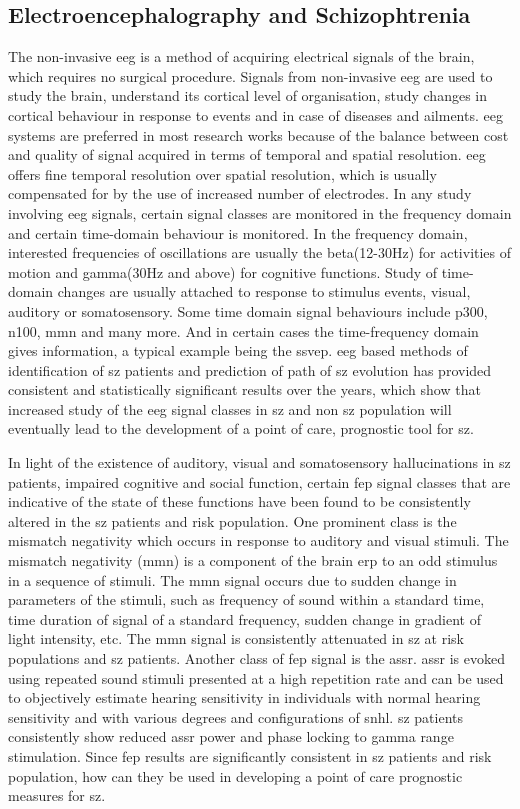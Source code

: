 \subsection{Electroencephalography and Schizophtrenia}
The non-invasive \ac{eeg} is a method of acquiring electrical signals of the brain, which requires no surgical procedure. Signals from non-invasive \ac{eeg} are used to study the brain, understand its cortical level of organisation, study changes in cortical behaviour in response to events and in case of diseases and ailments. \ac{eeg} systems are preferred in most research works because of the balance between cost and quality of signal acquired in terms of temporal and spatial resolution. \ac{eeg} offers fine temporal resolution over spatial resolution, which is usually compensated for by the use of increased number of electrodes. In any study involving \ac{eeg} signals, certain signal classes are monitored in the frequency domain and certain time-domain behaviour is monitored. In the frequency domain, interested frequencies of oscillations are usually the beta(12-30Hz) for activities of motion and gamma(30Hz and above) for cognitive functions. Study of time-domain changes are usually attached to response to stimulus events, visual, auditory or somatosensory. Some time domain signal behaviours include \ac{p300}, \ac{n100}, \ac{mmn} and many more. And in certain cases the time-frequency domain gives information, a typical example being the \ac{ssvep}. \ac{eeg} based methods of identification of \ac{sz} patients and prediction of path of \ac{sz} evolution has provided consistent and statistically significant results over the years, which show that increased study of the \ac{eeg} signal classes in \ac{sz} and non \ac{sz} population will eventually lead to the development of a point of care, prognostic tool for \ac{sz}.

In light of the existence of auditory, visual and somatosensory hallucinations in \ac{sz} patients, impaired cognitive and social function, certain \ac{fep} signal classes that are indicative of the state of these functions have been found to be consistently altered in the \ac{sz} patients and risk population. One prominent class is the mismatch negativity which occurs in response to auditory and visual stimuli. The mismatch negativity (\ac{mmn}) is a component of the brain \ac{erp} to an odd stimulus in a sequence of stimuli. The \ac{mmn} signal occurs due to sudden change in parameters of the stimuli, such as frequency of sound within a standard time, time duration of signal of a standard frequency, sudden change in gradient of light intensity, etc. The \ac{mmn} signal is consistently attenuated in \ac{sz} at risk populations and \ac{sz} patients. Another class of \ac{fep} signal is the \ac{assr}. \ac{assr} is evoked using repeated sound stimuli presented at a high repetition rate and can be used to objectively estimate hearing sensitivity in individuals with normal hearing sensitivity and with various degrees and configurations of \ac{snhl}. \ac{sz} patients consistently show reduced \ac{assr} power and phase locking to gamma range stimulation. Since \ac{fep} results are significantly consistent in \ac{sz} patients and risk population,  how can they be used in developing a point of care prognostic measures for \ac{sz}.

